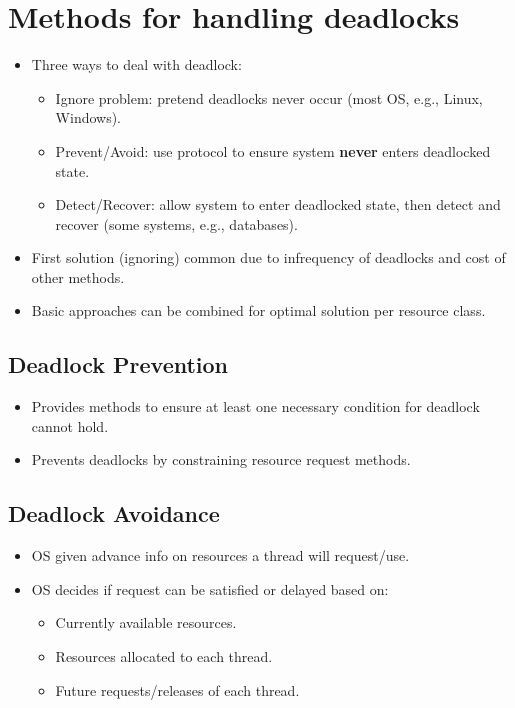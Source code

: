 \section{Methods for handling deadlocks}

\begin{itemize}[noitemsep, topsep=0pt]
    \item Three ways to deal with deadlock:
    \begin{itemize}[noitemsep, topsep=0pt]
        \item Ignore problem: pretend deadlocks never occur (most OS, e.g., Linux, Windows).
        \item Prevent/Avoid: use protocol to ensure system \textbf{never} enters deadlocked state.
        \item Detect/Recover: allow system to enter deadlocked state, then detect and recover (some systems, e.g., databases).
    \end{itemize}
    \item First solution (ignoring) common due to infrequency of deadlocks and cost of other methods.
    \item Basic approaches can be combined for optimal solution per resource class.
\end{itemize}

\subsection*{Deadlock Prevention}
\begin{itemize}[noitemsep, topsep=0pt]
    \item Provides methods to ensure at least one necessary condition for deadlock cannot hold.
    \item Prevents deadlocks by constraining resource request methods.
\end{itemize}

\subsection*{Deadlock Avoidance}
\begin{itemize}[noitemsep, topsep=0pt]
    \item OS given advance info on resources a thread will request/use.
    \item OS decides if request can be satisfied or delayed based on:
    \begin{itemize}[noitemsep, topsep=0pt]
        \item Currently available resources.
        \item Resources allocated to each thread.
        \item Future requests/releases of each thread.
    \end{itemize}
\end{itemize}

